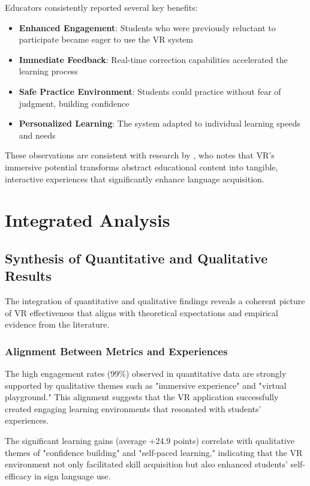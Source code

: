 \documentclass[12pt,a4paper]{article}
\begin{document}
Educators consistently reported several key benefits:

\begin{itemize}
    \item \textbf{Enhanced Engagement}: Students who were previously reluctant to participate became eager to use the VR system
    \item \textbf{Immediate Feedback}: Real-time correction capabilities accelerated the learning process
    \item \textbf{Safe Practice Environment}: Students could practice without fear of judgment, building confidence
    \item \textbf{Personalized Learning}: The system adapted to individual learning speeds and needs
\end{itemize}

These observations are consistent with research by \citet{zhang2024design}, who notes that VR's immersive potential transforms abstract educational content into tangible, interactive experiences that significantly enhance language acquisition.

\section{Integrated Analysis}

\subsection{Synthesis of Quantitative and Qualitative Results}

The integration of quantitative and qualitative findings reveals a coherent picture of VR effectiveness that aligns with theoretical expectations and empirical evidence from the literature.

\subsubsection{Alignment Between Metrics and Experiences}

The high engagement rates (99\%) observed in quantitative data are strongly supported by qualitative themes such as "immersive experience" and "virtual playground." This alignment suggests that the VR application successfully created engaging learning environments that resonated with students' experiences.

The significant learning gains (average +24.9 points) correlate with qualitative themes of "confidence building" and "self-paced learning," indicating that the VR environment not only facilitated skill acquisition but also enhanced students' self-efficacy in sign language use.
\end{document}
